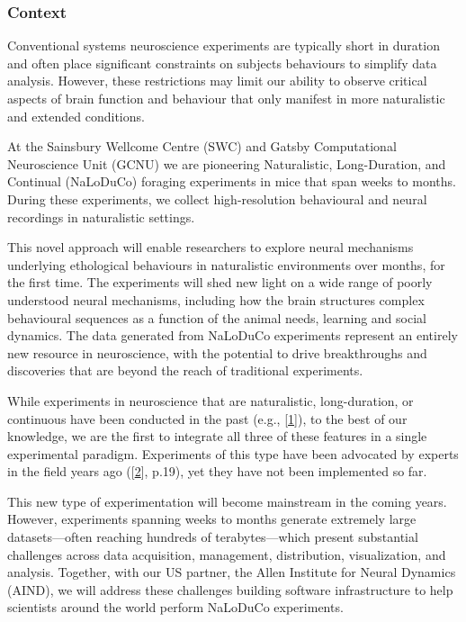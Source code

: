 \subsubsection{Context}

Conventional systems neuroscience experiments are typically short in duration
and often place significant constraints on subjects behaviours to simplify data
analysis.
%
However, these restrictions may limit our ability to observe critical
aspects of brain function and behaviour that only manifest in more naturalistic
and extended conditions.

At the Sainsbury Wellcome Centre (SWC) and Gatsby Computational Neuroscience
Unit (GCNU) we are pioneering Naturalistic, Long-Duration, and Continual
(NaLoDuCo) foraging experiments in mice that span weeks to months. During these
experiments, we collect high-resolution behavioural and neural recordings in
naturalistic settings.

This novel  approach will enable researchers to explore neural mechanisms
underlying ethological behaviours in naturalistic environments over months, for
the first time.  The experiments will shed new light on a wide range of poorly
understood neural mechanisms, including how the brain structures complex
behavioural sequences as a function of the animal needs, learning and social
dynamics.
%
The data generated from NaLoDuCo experiments represent an entirely new resource
in neuroscience, with the potential to drive breakthroughs and discoveries that
are beyond the reach of traditional experiments.

While experiments in neuroscience that are naturalistic, long-duration, or
continuous have been conducted in the past (e.g.,
[\href{https://pubmed.ncbi.nlm.nih.gov/37656619/}{1}]), to the best of our
knowledge, we are the first to integrate all three of these features in a
single experimental paradigm.
%
Experiments of this type have been advocated by experts in the field years ago
([\href{https://pubmed.ncbi.nlm.nih.gov/31600508/}{2}], p.19), yet they have
not been implemented so far.

This new type of experimentation will become mainstream in the coming years.
%
However, experiments spanning weeks to months generate extremely large
datasets—often reaching hundreds of terabytes—which present substantial
challenges across data acquisition, management, distribution, visualization,
and analysis.
%
Together, with our US partner, the Allen Institute for Neural Dynamics (AIND),
we will address these challenges building software infrastructure to help
scientists around the world perform NaLoDuCo experiments.

